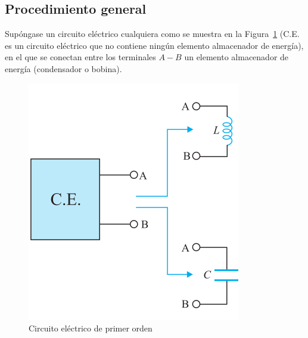 \documentclass[11pt]{book} %
\begin{document}

	
	
	
	
	
	
	
	
	\subsection{Procedimiento general}
	
	Supóngase un circuito eléctrico cualquiera como se muestra en la Figura~\ref{fig.CE_primerorden} (C.E. es un circuito eléctrico que no contiene ningún elemento almacenador de energía), en el que se conectan entre los terminales $A-B$ un elemento almacenador de energía (condensador o bobina). 
	\begin{figure}[htbp]
	    \centering
	    \includegraphics[width=0.38\linewidth]{../figs/CE_primerorden.pdf}
	    \caption{Circuito eléctrico de primer orden}	    \label{fig.CE_primerorden}
	\end{figure}
	
\end{document}
